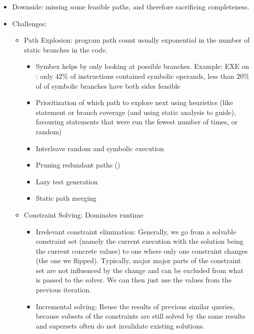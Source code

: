 \documentclass{article}
\begin{document}
\begin{itemize}
\begin{itemize}
          \end{itemize}
    \item Downside: missing some feasible paths, and therefore sacrificing completeness.
    \item Challenges:
          \begin{itemize}
              \item Path Explosion: program path count usually exponential in the number of static branches in the code.
                    \begin{itemize}
                        \item Symbex helps by only looking at possible branches. Example: EXE\cite{EXE} on : only 42\% of instructions contained symbolic operands, less than 20\% of of symbolic branches have both sides feasible\cite{EXE}
                        \item Prioritization of which path to explore next using heuristics (like statement or branch coverage (and using static analysis to guide), favouring statements that were run the fewest number of times, or random)
                        \item Interleave random and symbolic execution
                        \item Pruning redundant paths (\cite{RWset})
                        \item Lazy test generation
                        \item Static path merging
                    \end{itemize}
              \item Constraint Solving: Dominates runtime
                    \begin{itemize}
                        \item Irrelevant constraint elimination: Generally, we go from a solvable constraint set (namely the current execution with the solution being the current concrete values) to one where only one constraint changes (the one we flipped). Typically, major major parts of the constraint set are not influenced by the change and can be excluded from what is passed to the solver. We can then just use the values from the previous iteration.
                        \item Incremental solving: Reuse the results of previous similar queries, because subsets of the constraints are still solved by the same results and supersets often do not invalidate existing solutions.

\end{itemize}
\end{itemize}
\end{itemize}
\end{document}
